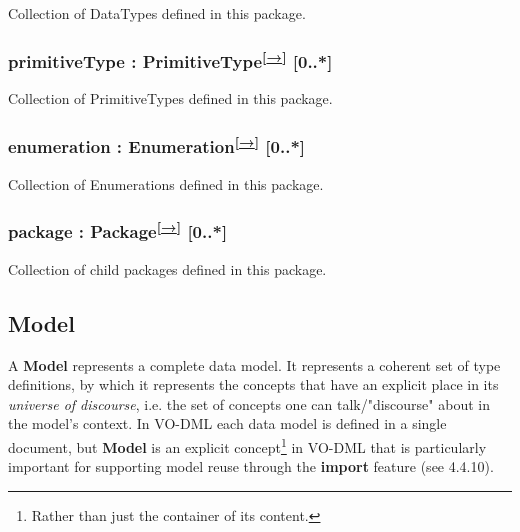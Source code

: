 \documentclass[10pt,a4paper]{ivoa}
\begin{document}
Collection of DataTypes defined in this package.

\hypertarget{primitivetype-primitivetype-0..}{%
\subsubsection{\texorpdfstring{primitiveType :
PrimitiveType\textsuperscript{{[}\protect\hyperlink{_Type_extends_ReferencableElement}{→}{]}}
{[}0..*{]}}{primitiveType : PrimitiveType{[}→{]} {[}0..*{]}}}\label{primitivetype-primitivetype-0..}}

Collection of PrimitiveTypes defined in this package.

\hypertarget{enumeration-enumeration-0..}{%
\subsubsection{\texorpdfstring{enumeration :
Enumeration\textsuperscript{{[}\protect\hyperlink{enumeration-extends-valuetype}{→}{]}}
{[}0..*{]}}{enumeration : Enumeration{[}→{]} {[}0..*{]}}}\label{enumeration-enumeration-0..}}

Collection of Enumerations defined in this package.

\hypertarget{package-package-0..}{%
\subsubsection{\texorpdfstring{package :
Package\textsuperscript{{[}\protect\hyperlink{package-extends-referableelement}{→}{]}}
{[}0..*{]}}{package : Package{[}→{]} {[}0..*{]}}}\label{package-package-0..}}

Collection of child packages defined in this package.

\hypertarget{model}{%
\subsection{Model}\label{model}}

A \textbf{Model} represents a complete data model. It represents a
coherent set of type definitions, by which it represents the concepts
that have an explicit place in its \emph{universe of discourse}, i.e.
the set of concepts one can talk/"discourse" about in the model's
context. In VO-DML each data model is defined in a single document, but
\textbf{Model} is an explicit concept\footnote{Rather than just the
  container of its content.} in VO-DML that is particularly important
for supporting model reuse through the \textbf{import} feature (see
4.4.10).
\end{document}

